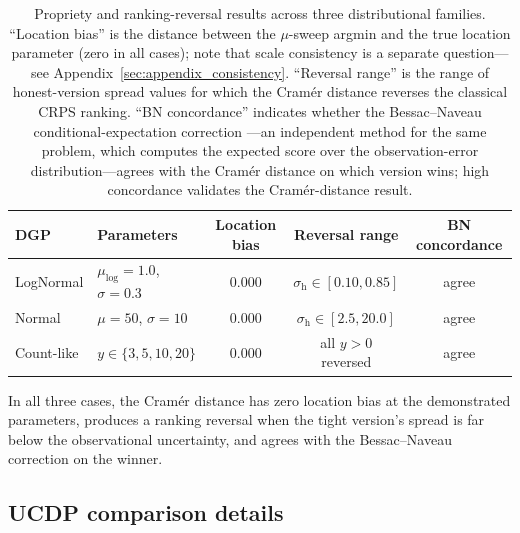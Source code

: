 \begin{table}[h]
    \centering
    \small
    \begin{tabular}{llccc}
        \toprule
        DGP & Parameters & Location bias & Reversal range & BN concordance \\
        \midrule
        LogNormal & $\mu_{\text{log}} = 1.0$, $\sigma = 0.3$ & 0.000 & $\sigma_\text{h} \in [0.10, 0.85]$ & agree \\
        Normal & $\mu = 50$, $\sigma = 10$ & 0.000 & $\sigma_\text{h} \in [2.5, 20.0]$ & agree \\
        Count-like & $y \in \{3, 5, 10, 20\}$ & 0.000 & all $y > 0$ reversed & agree \\
        \bottomrule
    \end{tabular}
    \caption{Propriety and ranking-reversal results across three distributional families. ``Location bias'' is the distance between the $\mu$-sweep argmin and the true location parameter (zero in all cases); note that scale consistency is a separate question---see Appendix~\ref{sec:appendix_consistency}. ``Reversal range'' is the range of honest-version spread values for which the Cram\'er distance reverses the classical CRPS ranking. ``BN concordance'' indicates whether the Bessac--Naveau conditional-expectation correction \citep{bessac2021forecast}---an independent method for the same problem, which computes the expected score over the observation-error distribution---agrees with the Cram\'er distance on which version wins; high concordance validates the Cram\'er-distance result.}
    \label{tab:multi_dgp}
\end{table}

In all three cases, the Cram\'er distance has zero location bias at the demonstrated parameters, produces a ranking reversal when the tight version's spread is far below the observational uncertainty, and agrees with the Bessac--Naveau correction on the winner.

\subsection{UCDP comparison details}

